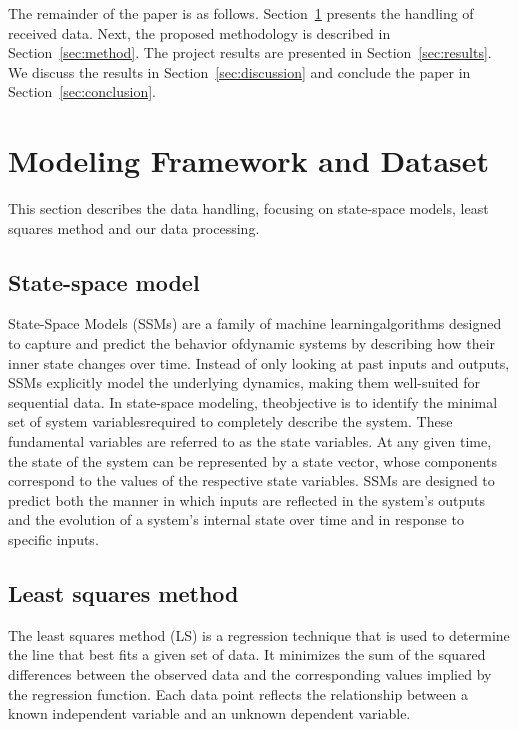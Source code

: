 \documentclass[sigconf,natbib=false, language=english]{acmart}
\begin{document}
The remainder of the paper is as follows. Section~\ref{sec:data} presents the handling of received data. Next, the proposed methodology is described in Section~\ref{sec:method}. The project results are presented in Section~\ref{sec:results}. We discuss the results in Section~\ref{sec:discussion} and conclude the paper in Section~\ref{sec:conclusion}.

\section{Modeling Framework and Dataset}
\label{sec:data}

This section describes the data handling, focusing on state-space models, least squares method and our data processing.


\subsection{State-space model}

State-Space Models (SSMs) are a family of machine learning\linebreak algorithms designed to capture and predict the behavior of\linebreak dynamic systems by describing how their inner state changes over time. 
Instead of only looking at past inputs and outputs, SSMs explicitly model the underlying dynamics, making them well-suited for sequential data. In state-space modeling, the\linebreak objective is to identify the minimal set of system variables\linebreak required to completely describe the system. These fundamental variables are referred to as the state variables. At any given time, the state of the system can be represented by a state vector, whose components correspond to the values of the respective state variables. SSMs are designed to predict both the manner in which inputs are reflected in the system's outputs and the evolution of a system's internal state over time and in response to specific inputs.

\subsection{Least squares method}

The least squares method (LS) is a regression technique that is used to determine the line that best fits a given set of data. It minimizes the sum of the squared differences between the observed data and the corresponding values implied by the regression function. Each data point reflects the relationship between a known independent variable and an unknown dependent variable.
\end{document}
